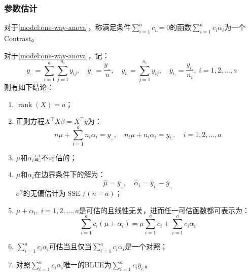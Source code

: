 \subsubsection{参数估计}
\begin{definition}
	对于\cref{model:one-way-anova}，称满足条件$\sum\limits_{i=1}^{a}c_i=0$的函数$\sum\limits_{i=1}^{a}c_i\alpha_i$为一个\gls{Contrast}。
\end{definition}
\begin{theorem}\label{theo:one-way-anova-estimate}
	对于\cref{model:one-way-anova}，记：
	\begin{equation*}
		y_{..}=\sum_{i=1}^a\sum_{j=1}^{n_i}y_{ij},\quad\overline{y}_{..}=\frac{y_{..}}{n},\quad y_{i.}=\sum_{j=1}^{n_i}y_{ij},\quad \overline{y}_{i.}=\frac{y_{i.}}{n_i},\;i=1,2,\dots,a
	\end{equation*}
	则有如下结论：
	\begin{enumerate}
		\item $\operatorname{rank}(X)=a$；
		\item 正则方程$X^{\top}X\beta=X^{\top}y$为：
		\begin{equation*}
			n\mu+\sum_{i=1}^{a}n_i\alpha_i=y_{..},\quad n_i\mu+n_i\alpha_i=y_{i.},\quad i=1,2,\dots,a
		\end{equation*}
		\item $\mu$和$\alpha_i$是不可估的；
		\item $\mu$和$\alpha_i$在边界条件下的解为：
		\begin{equation*}
			\hat{\mu}=\overline{y}_{..},\quad\hat{\alpha}_i=\overline{y}_{i.}-\overline{y}_{..}
		\end{equation*}
		$\sigma^2$的无偏估计为$\operatorname{SSE}/(n-a)$；
		\item $\mu+\alpha_i,\;i=1,2,\dots,a$是可估的且线性无关，进而任一可估函数都可表示为：
		\begin{equation*}
			\sum_{i=1}^{a}c_i(\mu+\alpha_i)=\mu\sum_{i=1}^{a}c_i+\sum_{i=1}^{a}c_i\alpha_i
		\end{equation*}
		\item $\sum\limits_{i=1}^{a}c_i\alpha_i$可估当且仅当$\sum\limits_{i=1}^{a}c_i\alpha_i$是一个对照；
		\item 对照$\sum\limits_{i=1}^{a}c_i\alpha_i$唯一的BLUE为$\sum\limits_{i=1}^{a}c_i\overline{y}_{i.}$。
	\end{enumerate}
\end{theorem}
